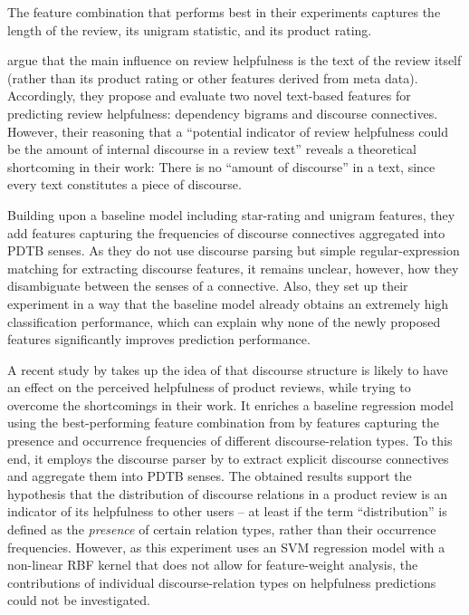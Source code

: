 \documentclass[
    a4paper,%
    12pt,%
    oneside,%
    toc=bibliography,
    final,
]{scrartcl}
\begin{document}
The feature combination that performs best in their experiments captures the length of the review, its unigram statistic, and its product rating.

\citet{Mertz2014} argue that the main influence on review helpfulness is the text of the review itself (rather than its product rating or other features derived from meta data). Accordingly, they propose and evaluate two novel text-based features for predicting review helpfulness: dependency bigrams and discourse connectives. However, their reasoning that a “potential indicator of review helpfulness could be the amount of internal discourse in a review text” \citep[7]{Mertz2014} reveals a theoretical shortcoming in their work: There is no “amount of discourse” in a text, since every text constitutes a piece of discourse.

Building upon a baseline model including star-rating and unigram features, they add features capturing the frequencies of discourse connectives aggregated into PDTB senses. As they do not use discourse parsing but simple regular-expression matching for extracting discourse features, it remains unclear, however, how they disambiguate between the senses of a connective. Also, they set up their experiment in a way that the baseline model already obtains an extremely high classification performance, which can explain why none of the newly proposed features significantly improves prediction performance.

A recent study by \citet{Golly2017} takes up the idea of \citet{Mertz2014} that discourse structure is likely to have an effect on the perceived helpfulness of product reviews, while trying to overcome the shortcomings in their work. It enriches a baseline regression model using the best-performing feature combination from \citet{Kim2006} by features capturing the presence and occurrence frequencies of different discourse-relation types. To this end, it employs the discourse parser by \citet{Lin2014} to extract explicit discourse connectives and aggregate them into PDTB senses. The obtained results support the hypothesis that the distribution of discourse relations in a product review is an indicator of its helpfulness to other users – at least if the term “distribution” is defined as the \textit{presence} of certain relation types, rather than their occurrence frequencies. However, as this experiment uses an SVM regression model with a non-linear RBF kernel that does not allow for feature-weight analysis, the contributions of individual discourse-relation types on helpfulness predictions could not be investigated.
\end{document}
